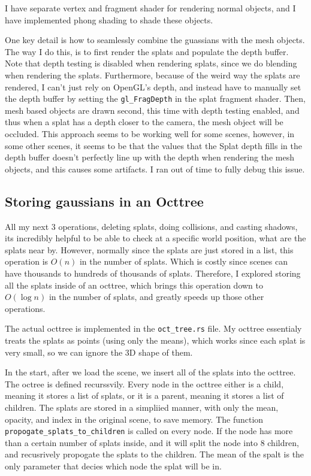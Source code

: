 \documentclass {article}
\begin{document}
I have separate vertex and fragment shader for rendering normal objects, and I have implemented phong shading to shade these objects.

One key detail is how to seamlessly combine the guassians with the mesh objects. The way I do this, is to first render the splats and populate the depth buffer. Note that depth testing is disabled when rendering splats, since we do blending when rendering the splats. Furthermore, because of the weird way the splats are rendered, I can't just rely on OpenGL's depth, and instead have to manually set the depth buffer by setting the \lstinline[style=inlinecode]{gl_FragDepth} in the splat fragment shader. Then, mesh based objects are drawn second, this time with depth testing enabled, and thus when a splat has a depth closer to the camera, the mesh object will be occluded. This approach seems to be working well for some scenes, however, in some other scenes, it seems to be that the values that the Splat depth fills in the depth buffer doesn't perfectly line up with the depth when rendering the mesh objects, and this causes some artifacts. I ran out of time to fully debug this issue. 




\subsection{Storing gaussians in an Octtree}
All my next 3 operations, deleting splats, doing collisions, and casting shadows, its incredibly helpful to be able to check at a specific world position, what are the splats near by. However, normally since the splats are just stored in a list, this operation is $O(n)$ in the number of splats. Which is costly since scenes can have thousands to hundreds of thousands of splats. Therefore, I explored storing all the splats inside of an octtree, which brings this operation down to $O(\log n)$ in the number of splats, and greatly speeds up those other operations.



The actual octtree is implemented in the \lstinline[style=inlinecode]{oct_tree.rs} file. My octtree essentialy treats the splats as points (using only the means), which works since each splat is very small, so we can ignore the 3D shape of them.

In the start, after we load the scene, we insert all of the splats into the octtree. The octree is defined recurssvily. Every node in the octtree either is a child, meaning it stores a list of splats, or it is a parent, meaning it stores a list of children. The splats are stored in a simpliied manner, with only the mean, opacity, and index in the original scene, to save memory. The function \lstinline[style=inlinecode]{propogate_splats_to_children} is called on every node. If the node has more than a certain number of splats inside, and it will split the node into 8 children, and recusrively propogate the splats to the children. The mean of the spalt is the only parameter that decies which node the splat will be in.
\end{document}
